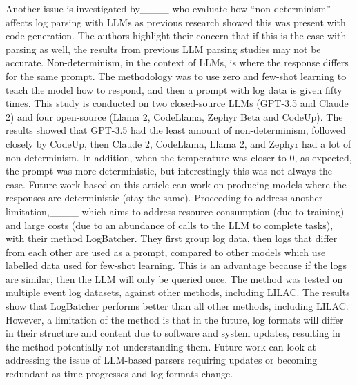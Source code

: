 Another issue is investigated by____ who evaluate how ``non-determinism'' affects log parsing with LLMs as previous research showed this was present with code generation. The authors highlight their concern that if this is the case with parsing as well, the results from previous LLM parsing studies may not be accurate. Non-determinism, in the context of LLMs, is where the response differs for the same prompt. The methodology was to use zero and few-shot learning to teach the model how to respond, and then a prompt with log data is given fifty times. This study is conducted on two closed-source LLMs (GPT-3.5 and Claude 2) and four open-source (Llama 2, CodeLlama, Zephyr Beta and CodeUp). The results showed that GPT-3.5 had the least amount of non-determinism, followed closely by CodeUp, then Claude 2, CodeLlama, Llama 2, and Zephyr had a lot of non-determinism. In addition, when the temperature was closer to 0, as expected, the prompt was more deterministic, but interestingly this was not always the case. Future work based on this article can work on producing models where the responses are deterministic (stay the same). Proceeding to address another limitation,____ which aims to address resource consumption (due to training) and large costs (due to an abundance of calls to the LLM to complete tasks), with their method LogBatcher. They first group log data, then logs that differ from each other are used as a prompt, compared to other models which use labelled data used for few-shot learning. This is an advantage because if the logs are similar, then the LLM will only be queried once. The method was tested on multiple event log datasets, against other methods, including LILAC. The results show that LogBatcher performs better than all other methods, including LILAC. However, a limitation of the method is that in the future, log formats will differ in their structure and content due to software and system updates, resulting in the method potentially not understanding them. Future work can look at addressing the issue of LLM-based parsers requiring updates or becoming redundant as time progresses and log formats change.

